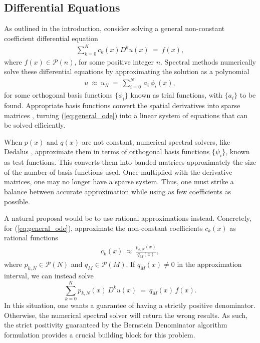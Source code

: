 \documentclass{article}
\begin{document}
\subsection{Differential Equations}\label{sec:differential_equations}
As outlined in the introduction, consider solving a general non-constant coefficient differential equation
\begin{align}\label{eq:general_ode}
    \sum_{k=0}^K c_k(x) D^k u(x)\ =\ f(x),
\end{align}
where $f(x)\in \mathcal{P}(n)$, for some positive integer $n$. Spectral methods numerically solve these differential equations by approximating the solution as a polynomial
\begin{align}
    u\ \approx\ u_N\ =\ \sum_{i=0}^N\, a_i\, \phi_i(x),
\end{align}
for some orthogonal basis functions $\{\phi_i\}$ known as trial functions, with $\{a_i\}$ to be found. Appropriate basis functions convert the spatial derivatives into sparse matrices \cite{dedalus, spectral_methods_sparse}, turning (\ref{eq:general_ode}) into a linear system of equations that can be solved efficiently.

When $p(x)$ and $q(x)$ are not constant, numerical spectral solvers, like Dedalus \cite{dedalus}, approximate them in terms of orthogonal basis functions $\{\psi_i\}$, known as test functions. This converts them into banded matrices approximately the size of the number of basis functions used. Once multiplied with the derivative matrices, one may no longer have a sparse system. Thus, one must strike a balance between accurate approximation while using as few coefficients as possible.

A natural proposal would be to use rational approximations instead. Concretely, for (\ref{eq:general_ode}), approximate the non-constant coefficients $c_k(x)$ as rational functions
\begin{align}
    c_k(x)\ \approx\ \frac{p_{k, N}(x)}{q_M(x)},
\end{align}
where $p_{k, N} \in \mathcal{P}(N)$ and $q_M \in \mathcal{P}(M)$. If $q_M(x)\neq 0$ in the approximation interval, we can instead solve
\begin{equation}
\sum_{k=0}^{K} p_{k,N}(x) \, D^{k} u(x) \ = \ q_{M}(x) \, f(x). \label{common denominator}
\end{equation} 
In this situation, one wants a guarantee of having a strictly positive denominator. Otherwise, the numerical spectral solver will return the wrong results. As such, the strict positivity guaranteed by the Bernstein Denominator algorithm formulation provides a crucial building block for this problem.
\end{document}
